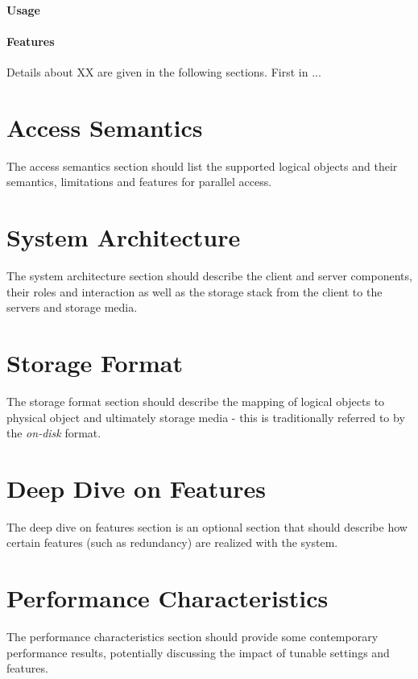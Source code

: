\documentclass{jhps}
\begin{document}
\paragraph{Usage}

\paragraph{Features}

\bigskip 

Details about XX are given in the following sections.
First in ...

\section{Access Semantics} \label{sec:acc_sem}
The access semantics section should list the supported logical objects and their semantics, limitations and features for parallel access.

\section{System Architecture} \label{sec:sys_arch}
The system architecture section should describe the client and server components, their roles and interaction as well as the storage stack from the client to the servers and storage media.

\section{Storage Format} \label{sec:sto_for}
The storage format section should describe the mapping of logical objects to physical object and ultimately storage media - this is traditionally referred to by the \textit{on-disk} format.

\section{Deep Dive on Features} \label{sec:deep_dive}
The deep dive on features section is an optional section that should describe how certain features (such as redundancy) are realized with the system.

\section{Performance Characteristics} \label{sec:per_char}
The performance characteristics section should provide some contemporary performance results, potentially discussing the impact of tunable settings and features.
\end{document}
